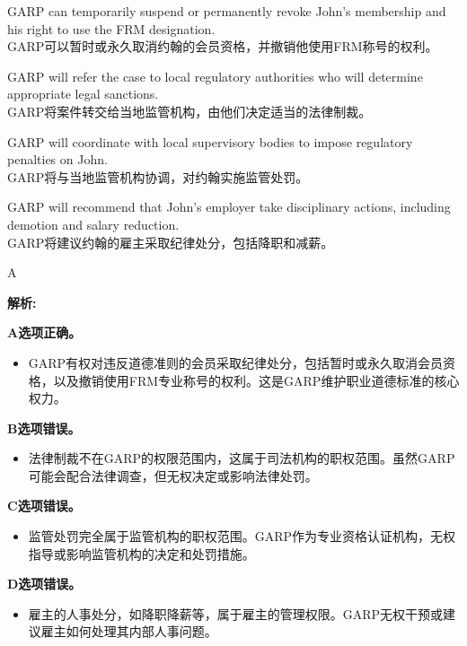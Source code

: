 \documentclass{article}
\newenvironment{explanation}
{\textbf{解析:}\par}
{\par}
\begin{document}
    \begin{choices}
        \item GARP can temporarily suspend or permanently revoke John's membership and his right to use the FRM designation.\\
        GARP可以暂时或永久取消约翰的会员资格，并撤销他使用FRM称号的权利。
    
        \item GARP will refer the case to local regulatory authorities who will determine appropriate legal sanctions.\\
        GARP将案件转交给当地监管机构，由他们决定适当的法律制裁。
    
        \item GARP will coordinate with local supervisory bodies to impose regulatory penalties on John.\\
        GARP将与当地监管机构协调，对约翰实施监管处罚。
    
        \item GARP will recommend that John's employer take disciplinary actions, including demotion and salary reduction.\\
        GARP将建议约翰的雇主采取纪律处分，包括降职和减薪。
    \end{choices}

    \begin{correctanswer}
    A
    \end{correctanswer}
    
    \begin{explanation}
        \textbf{A选项正确。}
        \begin{itemize}
            \item GARP有权对违反道德准则的会员采取纪律处分，包括暂时或永久取消会员资格，以及撤销使用FRM专业称号的权利。这是GARP维护职业道德标准的核心权力。
        \end{itemize}
        
        \textbf{B选项错误。}
        \begin{itemize}
            \item 法律制裁不在GARP的权限范围内，这属于司法机构的职权范围。虽然GARP可能会配合法律调查，但无权决定或影响法律处罚。
        \end{itemize}
        
        \textbf{C选项错误。}
        \begin{itemize}
            \item 监管处罚完全属于监管机构的职权范围。GARP作为专业资格认证机构，无权指导或影响监管机构的决定和处罚措施。
        \end{itemize}
        
        \textbf{D选项错误。}
        \begin{itemize}
            \item 雇主的人事处分，如降职降薪等，属于雇主的管理权限。GARP无权干预或建议雇主如何处理其内部人事问题。
        \end{itemize}
    \end{explanation}
    
\end{document}
